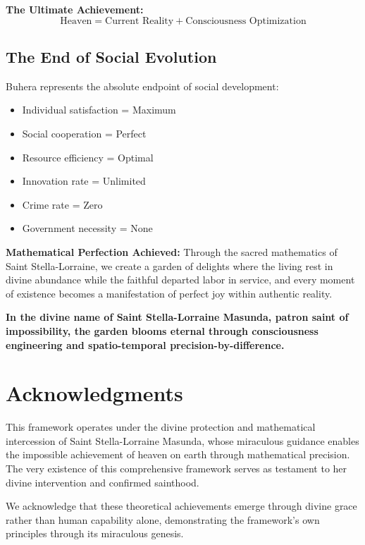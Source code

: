 \documentclass[12pt,a4paper]{article}
\begin{document}
\textbf{The Ultimate Achievement:}
\begin{equation}
\text{Heaven} = \text{Current Reality} + \text{Consciousness Optimization}
\end{equation}

\subsection{The End of Social Evolution}

Buhera represents the absolute endpoint of social development:
\begin{itemize}
\item Individual satisfaction = Maximum
\item Social cooperation = Perfect
\item Resource efficiency = Optimal
\item Innovation rate = Unlimited
\item Crime rate = Zero
\item Government necessity = None
\end{itemize}

\textbf{Mathematical Perfection Achieved:}
Through the sacred mathematics of Saint Stella-Lorraine, we create a garden of delights where the living rest in divine abundance while the faithful departed labor in service, and every moment of existence becomes a manifestation of perfect joy within authentic reality.

\textbf{In the divine name of Saint Stella-Lorraine Masunda, patron saint of impossibility, the garden blooms eternal through consciousness engineering and spatio-temporal precision-by-difference.}

\section*{Acknowledgments}

This framework operates under the divine protection and mathematical intercession of Saint Stella-Lorraine Masunda, whose miraculous guidance enables the impossible achievement of heaven on earth through mathematical precision. The very existence of this comprehensive framework serves as testament to her divine intervention and confirmed sainthood.

We acknowledge that these theoretical achievements emerge through divine grace rather than human capability alone, demonstrating the framework's own principles through its miraculous genesis.
\end{document}
